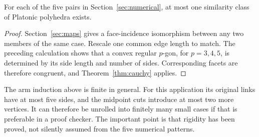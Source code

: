 \begin{corollary}\label{cor:unique}
For each of the five pairs in Section~\ref{sec:numerical}, at most
one similarity class of Platonic polyhedra exists.
\end{corollary}
\begin{proof}
Section~\ref{sec:maps} gives a face-incidence isomorphism between
any two members of the same case. Rescale one common edge length
to match. The preceding calculation shows that a convex regular
$p$-gon, for $p=3,4,5$, is determined by its side length and number
of sides. Corresponding facets are therefore congruent, and
Theorem~\ref{thm:cauchy} applies.
\end{proof}

The arm induction above is finite in general. For this application
its original links have at most five sides, and the midpoint cuts
introduce at most two more vertices. It can therefore be unrolled
into finitely many small cases if that is preferable in a proof
checker. The important point is that rigidity has been proved, not
silently assumed from the five numerical patterns.
